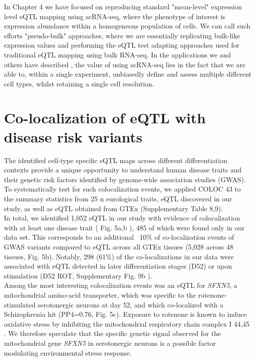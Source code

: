 In Chapter 4 we have focused on reproducing standard "mean-level" expression level eQTL mapping using scRNA-seq, where the phenotype of interest is expression abundance within a homogeneous population of cells.
We can call such efforts "pseudo-bulk" approaches, where we are essentially replicating bulk-like expression values and performing the eQTL test adapting approaches used for traditional eQTL mapping using bulk RNA-seq. 
In the applications we and others have described \cite{van2018single,cuomo2020single}, the value of using scRNA-seq lies in the fact that we are able to, within a single experiment, unbiasedly define and assess multiple different cell types, whilst retaining a single cell resolution.\\

\section{Co-localization of eQTL with disease risk variants}

The identified cell-type specific eQTL maps across different differentiation contexts provide a unique opportunity to understand human disease traits and their genetic risk factors identified by genome-wide association studies (GWAS). 
To systematically test for such colocalization events, we applied COLOC 43 \cite{giambartolomei2014bayesian} to the summary statistics from 25 n eurological traits, eQTL discovered in our study, as well as eQTL obtained from GTEx (Supplementary Table 8,9).\\

In total, we identified 1,052 eQTL in our study with evidence of colocalization with at least one disease trait ( Fig. 5a,b ), 485 of which were found only in our data set. 
This corresponds to an additional ~10\% of co-localization events of GWAS variants compared to eQTL across all GTEx tissues (5,028 across 48 tissues, Fig. 5b). 
Notably, 298 (61\%) of the co-localizations in our data were associated with eQTL detected in later differentiation stages (D52) or upon stimulation (D52 ROT, Supplementary Fig. 9b ).\\

Among the most interesting colocalization events was an eQTL for \textit{SFXN5}, a mitochondrial amino-acid transporter, which was specific to the rotenone-stimulated serotonergic neurons at day 52, and which co-localized with a Schizophrenia hit (PP4=0.76, Fig. 5c). 
Exposure to rotenone is known to induce oxidative stress by inhibiting the mitochondrial respiratory chain complex I 44,45 \cite{palmer1968studies, betarbet2000chronic}. 
We therefore speculate that the specific genetic signal observed for the mitochondrial gene \textit{SFXN5} in serotonergic neurons is a possible factor modulating environmental stress response.\\

